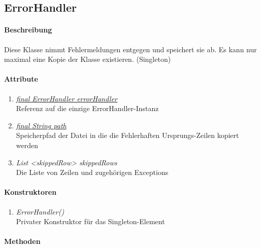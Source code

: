 \subsection{ErrorHandler}

\paragraph{Beschreibung}
Diese Klasse nimmt Fehlermeldungen entgegen und speichert sie ab. Es kann nur maximal eine Kopie der Klasse existieren. (Singleton)

\paragraph{Attribute}

\begin{enumerate}[$\bullet$]
	\item \underline{\textit{final ErrorHandler errorHandler}} \\
	Referenz auf die einzige ErrorHandler-Instanz
	\item \underline{\textit{final String path}} \\
	Speicherpfad der Datei in die die Fehlerhaften Ursprungs-Zeilen kopiert werden
	\item \textit{List <skippedRow> skippedRows} \\
	Die Liste von Zeilen und zugehörigen Exceptions
\end{enumerate}

\paragraph{Konstruktoren}
\begin{enumerate}[-]
	\item \textit{ErrorHandler()} \\
	Privater Konstruktor für das Singleton-Element
\end{enumerate}

\paragraph{Methoden}

